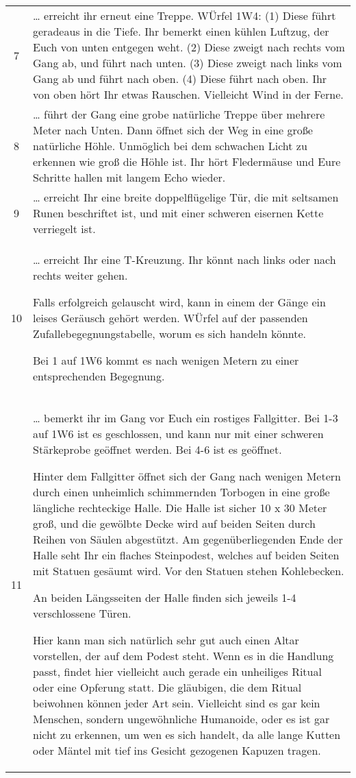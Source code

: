 \begin{tabularx}{\columnwidth}{cZ}
7 & 
  \ldots{} erreicht ihr erneut eine Treppe. WÜrfel 1W4: (1) Diese führt
  geradeaus in die Tiefe. Ihr bemerkt einen kühlen Luftzug, der Euch von
  unten entgegen weht. (2) Diese zweigt nach rechts vom Gang ab, und
  führt nach unten. (3) Diese zweigt nach links vom Gang ab und führt
  nach oben. (4) Diese führt nach oben. Ihr von oben hört Ihr etwas
  Rauschen. Vielleicht Wind in der Ferne.
\\
8 & 
  \ldots{} führt der Gang eine grobe natürliche Treppe über mehrere
  Meter nach Unten. Dann öffnet sich der Weg in eine große natürliche
  Höhle. Unmöglich bei dem schwachen Licht zu erkennen wie groß die
  Höhle ist. Ihr hört Fledermäuse und Eure Schritte hallen mit langem
  Echo wieder.
\\
9 & 
  \ldots{} erreicht Ihr eine breite doppelflügelige Tür, die mit
  seltsamen Runen beschriftet ist, und mit einer schweren eisernen Kette
  verriegelt ist.
\\
10 & 
  \ldots{} erreicht Ihr eine T-Kreuzung. Ihr könnt nach links oder nach
  rechts weiter gehen.

  Falls erfolgreich gelauscht wird, kann in einem der Gänge ein leises
  Geräusch gehört werden. WÜrfel auf der passenden
  Zufallebegegnungstabelle, worum es sich handeln könnte.

  Bei 1 auf 1W6 kommt es nach wenigen Metern zu einer entsprechenden
  Begegnung.
\\
11 & 
  \ldots{} bemerkt ihr im Gang vor Euch ein rostiges Fallgitter. Bei 1-3
  auf 1W6 ist es geschlossen, und kann nur mit einer schweren
  Stärkeprobe geöffnet werden. Bei 4-6 ist es geöffnet.

  Hinter dem Fallgitter öffnet sich der Gang nach wenigen Metern durch
  einen unheimlich schimmernden Torbogen in eine große längliche
  rechteckige Halle. Die Halle ist sicher 10 x 30 Meter groß, und die
  gewölbte Decke wird auf beiden Seiten durch Reihen von Säulen
  abgestützt. Am gegenüberliegenden Ende der Halle seht Ihr ein flaches
  Steinpodest, welches auf beiden Seiten mit Statuen gesäumt wird. Vor
  den Statuen stehen Kohlebecken.

  An beiden Längsseiten der Halle finden sich jeweils 1-4 verschlossene
  Türen.

  Hier kann man sich natürlich sehr gut auch einen Altar vorstellen, der
  auf dem Podest steht. Wenn es in die Handlung passt, findet hier
  vielleicht auch gerade ein unheiliges Ritual oder eine Opferung statt.
  Die gläubigen, die dem Ritual beiwohnen können jeder Art sein.
  Vielleicht sind es gar kein Menschen, sondern ungewöhnliche Humanoide,
  oder es ist gar nicht zu erkennen, um wen es sich handelt, da alle
  lange Kutten oder Mäntel mit tief ins Gesicht gezogenen Kapuzen
  tragen.
\\
\end{tabularx}
